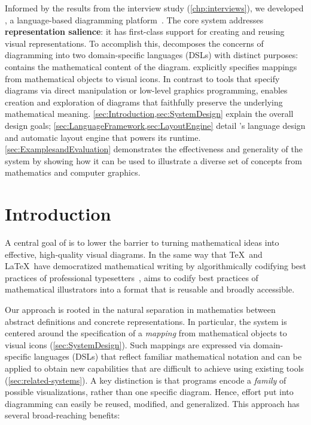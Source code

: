 Informed by the results from the interview study (\cref{chp:interviews}), we developed \Penrose, a language-based diagramming platform~\cite{penrose}. The core \Penrose system addresses \textbf{representation salience}: it has first-class support for creating and reusing visual representations. To accomplish this, \Penrose decomposes the concerns of diagramming into two domain-specific languages (DSLs) with distinct purposes: \Substance contains the mathematical content of the diagram. \Style explicitly specifies mappings from mathematical objects to visual icons. In contrast to tools that specify diagrams via direct manipulation or low-level graphics programming, \Penrose{} enables creation and exploration of diagrams that faithfully preserve the underlying mathematical meaning. \cref{sec:Introduction,sec:SystemDesign} explain the overall design goals; \cref{sec:LanguageFramework,sec:LayoutEngine} detail \Penrose{}'s language design and automatic layout engine that powers its runtime. \cref{sec:ExamplesandEvaluation} demonstrates the effectiveness and generality of the system by showing how it can be used to illustrate a diverse set of concepts from mathematics and computer graphics.

\section{Introduction}
\label{sec:Introduction}

A central goal of \Penrose{} is to lower the barrier to turning mathematical ideas into effective, high-quality visual diagrams.  In the same way that \TeX\ and \LaTeX\ have democratized mathematical writing by algorithmically codifying best practices of professional typesetters~\cite{Beeton:2016:CMT}, \Penrose{} aims to codify best practices of mathematical illustrators into a format that is reusable and broadly accessible.

Our approach is rooted in the natural separation in mathematics between abstract definitions and concrete representations. In particular, the \Penrose{} system is centered around the specification of a \emph{mapping} from mathematical objects to visual icons (\cref{sec:SystemDesign}).  Such mappings are expressed via domain-specific languages (DSLs) that reflect familiar mathematical notation and can be applied to obtain new capabilities that are difficult to achieve using existing tools (\cref{sec:related-systems}).  A key distinction is that \Penrose{} programs encode a \emph{family} of possible visualizations, rather than one specific diagram.  Hence, effort put into diagramming can easily be reused, modified, and generalized.  This approach has several broad-reaching benefits:

